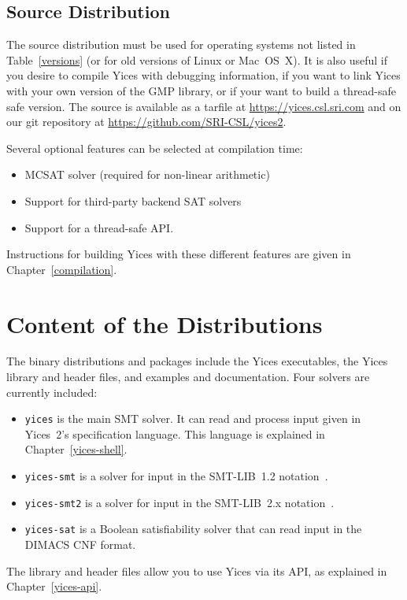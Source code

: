 \documentclass[11pt,twoside,fleqn,openright,titlepage]{cslreport}
\begin{document}
\subsection{Source Distribution}

The source distribution must be used for operating systems not listed
in Table~\ref{versions} (or for old versions of Linux or Mac~OS~X). It
is also useful if you desire to compile Yices with debugging
information, if you want to link Yices with your own version of the
GMP library, or if your want to build a thread-safe safe version.
The source is available as a tarfile at
\url{https://yices.csl.sri.com} and on our git repository at
\url{https://github.com/SRI-CSL/yices2}.

\medskip\noindent
Several optional features can be selected at compilation time:
\begin{itemize}
\item MCSAT solver (required for non-linear arithmetic)
\item Support for third-party backend SAT solvers
\item Support for a thread-safe API.
\end{itemize}
Instructions for building Yices with these different features are given in Chapter~\ref{compilation}.



\section{Content of the Distributions}

The binary distributions and packages include the Yices executables,
the Yices library and header files, and examples and documentation.
Four solvers are currently included:
\begin{itemize}
\item \texttt{yices} is  the main SMT solver. It  can read and process
  input given  in Yices~2's  specification language. This  language is
  explained in Chapter~\ref{yices-shell}.

\item  \texttt{yices-smt} is  a solver  for input  in  the SMT-LIB~1.2
  notation~\cite{SMTLIB12:2006}.

\item \texttt{yices-smt2} is a solver for input in the SMT-LIB~2.x
  notation~\cite{SMTLIB25:2015}.

\item \texttt{yices-sat}  is a Boolean satisfiability  solver that can
  read input in the DIMACS CNF format.
\end{itemize}
The library and header files allow you to use Yices via its API, as
explained in Chapter~\ref{yices-api}.
\end{document}
